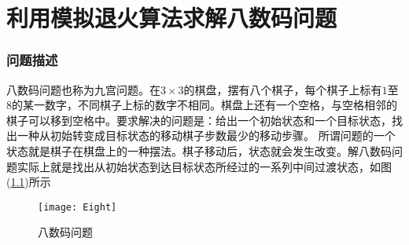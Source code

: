 
\chapter{利用模拟退火算法求解八数码问题}

\subsection{问题描述}
八数码问题也称为九宫问题。在$3\times 3$的棋盘，摆有八个棋子，每个棋子上标有$1$至$8$的某一数字，不同棋子上标的数字不相同。棋盘上还有一个空格，与空格相邻的棋子可以移到空格中。要求解决的问题是：给出一个初始状态和一个目标状态，找出一种从初始转变成目标状态的移动棋子步数最少的移动步骤。
所谓问题的一个状态就是棋子在棋盘上的一种摆法。棋子移动后，状态就会发生改变。解八数码问题实际上就是找出从初始状态到达目标状态所经过的一系列中间过渡状态，如图(\ref{fig:Eight})所示

\begin{figure}[htbp]\label{fig:Eight}
\centering
                \texttt{[image: Eight]}
\caption{八数码问题}
\vspace{-1em}
\end{figure}
